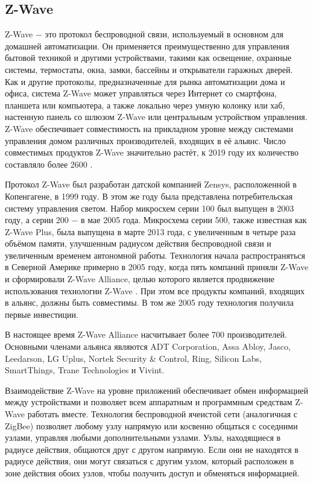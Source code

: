 	
	\subsection{Z-Wave}
	Z-Wave $-$ это протокол беспроводной связи, используемый в основном для домашней автоматизации. 
	Он применяется преимущественно для управления бытовой техникой и другими устройствами, такими 
	как освещение, охранные системы, термостаты, окна, замки, бассейны и открыватели гаражных дверей.
	Как и другие протоколы, предназначенные для рынка автоматизации дома и офиса, система Z-Wave может 
	управляться через Интернет со смартфона, планшета или компьютера, а также локально через умную 
	колонку или хаб, настенную панель со шлюзом Z-Wave или центральным устройством управления. 
	Z-Wave обеспечивает совместимость на прикладном уровне между системами управления домом различных 
	производителей, входящих в её альянс. Число совместимых продуктов Z-Wave значительно растёт, 
	к 2019 году их количество составляло более 2600 \cite{z-wave-certified-products}.
	
	Протокол Z-Wave был разработан датской компанией Zensys, расположенной в Копенгагене, 
	в 1999 году. В этом же году была представлена потребительская 
	систему управления светом. Набор микросхем серии 100 был выпущен в 2003 году, а серии 200 $-$ 
	в мае 2005 года. Микросхема серии 500, также известная как Z-Wave Plus, была выпущена в марте 2013 года,
	с увеличенным в четыре раза объёмом памяти, улучшенным радиусом действия беспроводной связи и 
	увеличенным временем автономной работы. Технология начала распространяться в Северной Америке 
	примерно в 2005 году, когда пять компаний приняли Z-Wave и сформировали Z-Wave Alliance, целью 
	которого является продвижение использования технологии Z-Wave \cite{z-wave-alliance}. При этом 
	все продукты компаний, входящих в альянс, должны быть совместимы. В том же 2005 году технология
	получила первые инвестиции.
	
	В настоящее время Z-Wave Alliance насчитывает более 700 производителей. Основными членами альянса 
	являются ADT Corporation, Assa Abloy, Jasco, Leedarson, LG Uplus, Nortek Security \& Control, Ring, Silicon Labs, 
	SmartThings, Trane Technologies и Vivint.
	
	Взаимодействие Z-Wave на уровне приложений обеспечивает обмен информацией между устройствами 
	и позволяет всем аппаратным и программным средствам Z-Wave работать вместе. Технология беспроводной 
	ячеистой сети (аналогичная с ZigBee) позволяет любому узлу напрямую или косвенно общаться с соседними 
	узлами, управляя любыми дополнительными узлами. Узлы, находящиеся в радиусе действия, общаются друг 
	с другом напрямую. Если они не находятся в радиусе действия, они могут связаться с другим узлом, 
	который расположен в зоне действия обоих узлов, чтобы получить доступ и обменяться информацией.
	
